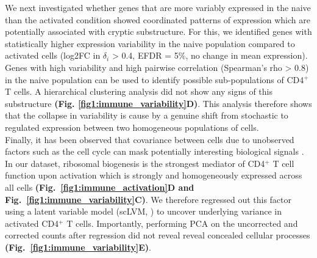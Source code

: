 We next investigated whether genes that are more variably expressed in the naive than the activated condition showed coordinated patterns of expression which are potentially associated with cryptic substructure. For this, we identified genes with statistically higher expression variability in the naive population compared to activated cells (log2FC in $\delta_i$ > 0.4, EFDR = 5\%, no change in mean expression). Genes with high variability and high pairwise correlation (Spearman’s rho > 0.8) in the naive population can be used to identify possible sub-populations of CD4$^+$ T cells. A hierarchical clustering analysis did not show any signs of this substructure \textbf{(Fig. \ref{fig1:immune_variability}D)}. This analysis therefore shows that the collapse in variability is cause by a genuine shift from stochastic to regulated expression between two homogeneous populations of cells.\\

Finally, it has been observed that covariance between cells due to unobserved factors such as the cell cycle can mask potentially interesting biological signals \citep{Stegle2015, Buettner2015}. In our dataset, ribosomal biogenesis is the strongest mediator of CD4$^+$ T cell function upon activation which is strongly and homogeneously expressed across all cells \textbf{(Fig.~\ref{fig1:immune_activation}D and Fig.~\ref{fig1:immune_variability}C)}. We therefore regressed out this factor using a latent variable model (scLVM, \citep{Buettner2015}) to uncover underlying variance in activated CD4$^+$ T cells. Importantly, performing PCA on the uncorrected and corrected counts after regression did not reveal reveal concealed cellular processes \textbf{(Fig.~\ref{fig1:immune_variability}E)}.\\

\newpage


